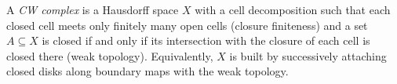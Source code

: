 
A \emph{CW complex} is a Hausdorff space $X$ with a cell decomposition such that each closed cell meets only finitely many open cells (closure finiteness) and a set $A\subseteq X$ is closed if and only if its intersection with the closure of each cell is closed there (weak topology). Equivalently, $X$ is built by successively attaching closed disks along boundary maps with the weak topology.
